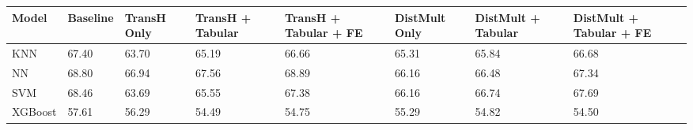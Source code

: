 \begin{tabular}{llllllll}
\toprule
Model & Baseline & TransH Only & TransH + Tabular & TransH + Tabular + FE & DistMult Only & DistMult + Tabular & DistMult + Tabular + FE \\
\midrule
KNN & 67.40 & 63.70 & 65.19 & 66.66 & 65.31 & 65.84 & 66.68 \\
NN & 68.80 & 66.94 & 67.56 & 68.89 & 66.16 & 66.48 & 67.34 \\
SVM & 68.46 & 63.69 & 65.55 & 67.38 & 66.16 & 66.74 & 67.69 \\
XGBoost & 57.61 & 56.29 & 54.49 & 54.75 & 55.29 & 54.82 & 54.50 \\
\bottomrule
\end{tabular}
